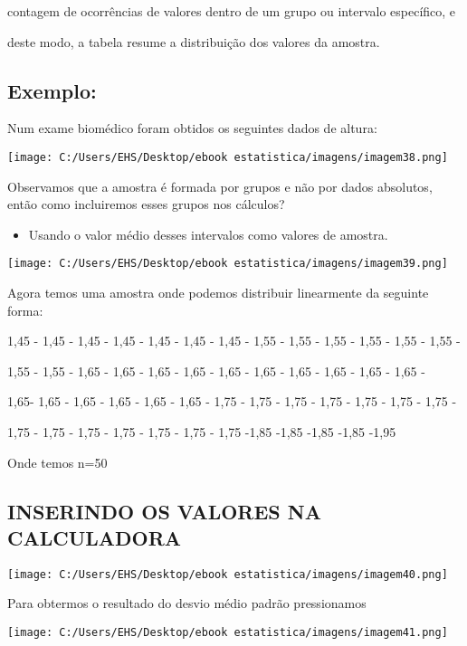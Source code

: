 \documentclass[]{book}
\providecommand{\tightlist}{%
  \setlength{\itemsep}{0pt}\setlength{\parskip}{0pt}}
\begin{document}
contagem de ocorrências de valores dentro de um grupo ou intervalo específico, e

deste modo, a tabela resume a distribuição dos valores da amostra.

\hypertarget{exemplo}{%
\subsection{Exemplo:}\label{exemplo}}

Num exame biomédico foram obtidos os seguintes dados de altura:

\texttt{[image: C:/Users/EHS/Desktop/ebook estatistica/imagens/imagem38.png]}

Observamos que a amostra é formada por grupos e não por dados absolutos, então como incluiremos esses grupos nos cálculos?

\begin{itemize}
\tightlist
\item
  Usando o valor médio desses intervalos como valores de amostra.
\end{itemize}

\texttt{[image: C:/Users/EHS/Desktop/ebook estatistica/imagens/imagem39.png]}

Agora temos uma amostra onde podemos distribuir linearmente da seguinte forma:

1,45 - 1,45 - 1,45 - 1,45 - 1,45 - 1,45 - 1,45 - 1,55 - 1,55 - 1,55 - 1,55 - 1,55 - 1,55 -

1,55 - 1,55 - 1,65 - 1,65 - 1,65 - 1,65 - 1,65 - 1,65 - 1,65 - 1,65 - 1,65 - 1,65 -

1,65- 1,65 - 1,65 - 1,65 - 1,65 - 1,65 - 1,75 - 1,75 - 1,75 - 1,75 - 1,75 - 1,75 - 1,75 -

1,75 - 1,75 - 1,75 - 1,75 - 1,75 - 1,75 - 1,75 -1,85 -1,85 -1,85 -1,85 -1,95

Onde temos n=50

\hypertarget{inserindo-os-valores-na-calculadora}{%
\subsection{INSERINDO OS VALORES NA CALCULADORA}\label{inserindo-os-valores-na-calculadora}}

\texttt{[image: C:/Users/EHS/Desktop/ebook estatistica/imagens/imagem40.png]}

Para obtermos o resultado do desvio médio padrão pressionamos

\texttt{[image: C:/Users/EHS/Desktop/ebook estatistica/imagens/imagem41.png]}
\end{document}
